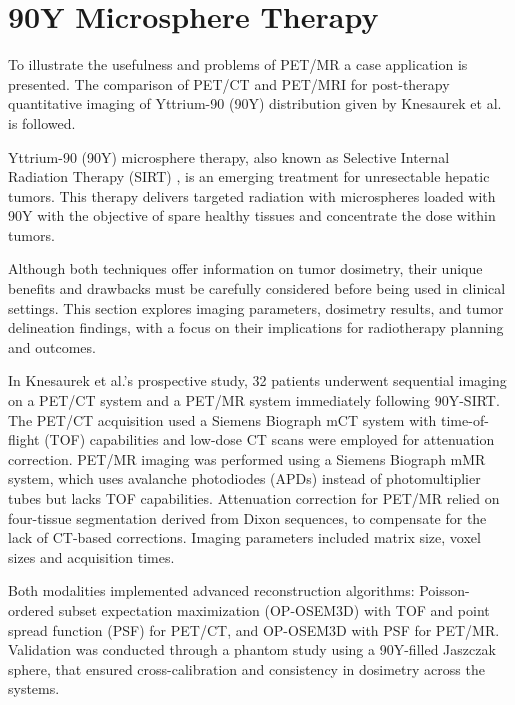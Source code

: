 




\section*{90Y Microsphere Therapy}
\label{sec:case1}

To illustrate the usefulness and problems of PET/MR a case application is presented. The comparison of PET/CT and PET/MRI for post-therapy quantitative imaging of Yttrium-90 (90Y) distribution given by Knesaurek et al. \cite{knesaurek2018} is followed.

Yttrium-90 (90Y) microsphere therapy, also known as Selective Internal Radiation Therapy (SIRT) %
, is an emerging treatment for unresectable hepatic tumors. This therapy delivers targeted radiation with microspheres loaded with 90Y with the objective of spare healthy tissues and concentrate the dose within tumors.

Although both techniques offer information on tumor dosimetry, their unique benefits and drawbacks must be carefully considered before being used in clinical settings. This section explores imaging parameters, dosimetry results, and tumor delineation findings, with a focus on their implications for radiotherapy planning and outcomes.

In Knesaurek et al.’s prospective study, 32 patients underwent sequential imaging on a PET/CT system and a PET/MR system immediately following 90Y-SIRT. The PET/CT acquisition used a Siemens Biograph mCT system with time-of-flight (TOF) capabilities and low-dose CT scans were employed for attenuation correction. PET/MR imaging was performed using a Siemens Biograph mMR system, which uses avalanche photodiodes (APDs) instead of photomultiplier tubes but lacks TOF capabilities. 
Attenuation correction for PET/MR relied on four-tissue segmentation derived from Dixon sequences, %
to compensate for the lack of CT-based corrections. Imaging parameters included matrix size, voxel sizes and acquisition times. 


Both modalities implemented advanced reconstruction algorithms: Poisson-ordered subset expectation maximization (OP-OSEM3D) with TOF and point spread function (PSF) for PET/CT, and OP-OSEM3D with PSF for PET/MR. Validation was conducted through a phantom study using a 90Y-filled Jaszczak sphere, that ensured cross-calibration and consistency in dosimetry across the systems.

